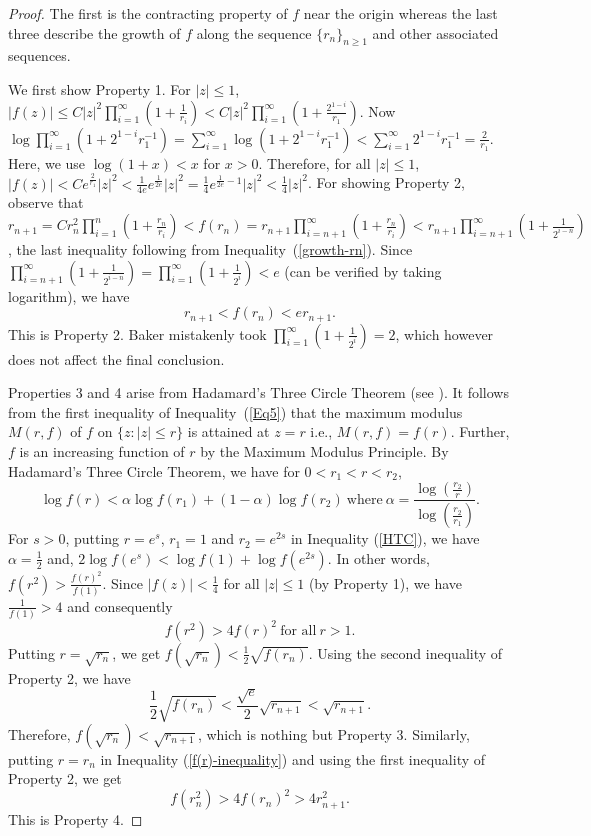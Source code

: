 \documentclass[11pt,a4paper]{article}
\begin{document}
\begin{proof}
	\par The first is the contracting property of $f$ near the origin whereas the last three describe the growth of $f$ along the sequence $\{r_n\}_{n\geq 1}$ and other associated sequences. 
	\par We first show Property 1. For $|z| \leq 1$, $|f(z)| \leq C |z|^2 \prod_{i=1}^{\infty}\left(1+\frac{1}{r_i}\right)<C |z|^2 \prod_{i=1}^{\infty}\left(1+\frac{2^{1-i}}{r_1}\right)$. Now $\log\prod_{i=1}^{\infty}(1+2^{1-i}r_1^{-1})=\sum_{i=1}^{\infty}\log(1+2^{1-i}r_1^{-1})<\sum_{i=1}^{\infty}2^{1-i}r_1^{-1}=\frac{2}{r_1}$. Here, we use $\log(1+x)<x$ for $x>0$. Therefore, for all $|z|\leq 1$, $|f(z)|< Ce^{\frac{2}{r_1}}|z|^2 <  \frac{1}{4e}e^{\frac{1}{2e}}|z|^2=\frac{1}{4} e^{\frac{1}{2e}-1}|z|^2< \frac{1}{4}|z|^2$. For showing Property 2, observe that $r_{n+1}=Cr_n^2\prod_{i=1}^{n}\left(1+\frac{r_n}{r_i}\right)<f(r_n)=r_{n+1}\prod_{i=n+1}^{\infty}\left(1+\frac{r_n}{r_i}\right)<	r_{n+1}\prod_{i=n+1}^{\infty}\left(1+\frac{1}{2^{i-n}}\right)$, the last inequality following from Inequality~(\ref{growth-rn}). Since $\prod_{i=n+1}^{\infty}\left(1+\frac{1}{2^{i-n}}\right) = \prod_{i=1}^{\infty}\left(1+\frac{1}{2^i}\right)<e 
	$ (can be verified by taking logarithm),
	we have 	
\begin{equation}
	 r_{n+1} < f(r_n) <er_{n+1}.
	 \label{f(rn)-bound}
\end{equation}	
 This is Property 2.
 Baker mistakenly took  $\prod_{i=1}^{\infty}\left(1+\frac{1}{2^i}\right)=2$, which however does not affect the final conclusion. 
 \par Properties 3 and 4 arise  from Hadamard's Three Circle Theorem (see \cite{Hadamard1896}). It follows from the first inequality of Inequality~(\ref{Eq5}) that the maximum modulus $M(r,f)$ of $f$ on $\{z: |z|\leq r\}$ is attained at $z=r$ i.e., $M(r,f)=f(r)$. Further,   $f $ is an increasing function of $r$ by the Maximum Modulus Principle. By Hadamard's Three Circle Theorem, we have for $0<r_1<r<r_2$, \begin{equation}\label{HTC}
		\log f(r)<\alpha \log f(r_1)+(1-\alpha)\log f(r_2) ~\mbox{where}~ \alpha=\frac{\log\left(\frac{r_2}{r}\right)}{\log\left(\frac{r_2}{r_1}\right)}.
	\end{equation}
	For $s>0$, putting $r=e^s$, $r_1=1$ and $r_2=e^{2s}$ in Inequality (\ref{HTC}), we have $\alpha=\frac{1}{2}$ and,  $2\log f(e^s)<\log f(1)+\log f(e^{2s}).$  In other words, $f(r^2)>\frac{f(r)^2}{f(1)}$. Since $|f(z)|<\frac{1}{4}$ for all $|z|\leq 1$ (by Property 1), we have $\frac{1}{f(1)}>4$ and consequently 
	\begin{equation}\label{f(r)-inequality}
		f(r^2)>4f(r)^2~\mbox{for all} ~r>1.
	\end{equation} Putting $r=\sqrt{r_n}$, we get $ f(\sqrt{r_n})< \frac{1}{2}\sqrt{ f(r_n)}$. Using the second inequality of Property 2, we have $$ \frac{1}{2}{\sqrt{f(r_n)}}<\frac{\sqrt{e}}{2}\sqrt{r_{n+1}}<\sqrt{r_{n+1}}.$$ Therefore, $f({\sqrt{r_n}})<{\sqrt{r_{n+1}}}$, which is nothing but Property 3.
Similarly, putting $r=r_n$ in Inequality (\ref{f(r)-inequality}) and using the first inequality of Property 2, we get 
	$$f({r^2_n})>4{f({r_n})}^2>4{r^2_{n+1}}.$$ This is Property 4.
	

\end{proof}
\end{document}
